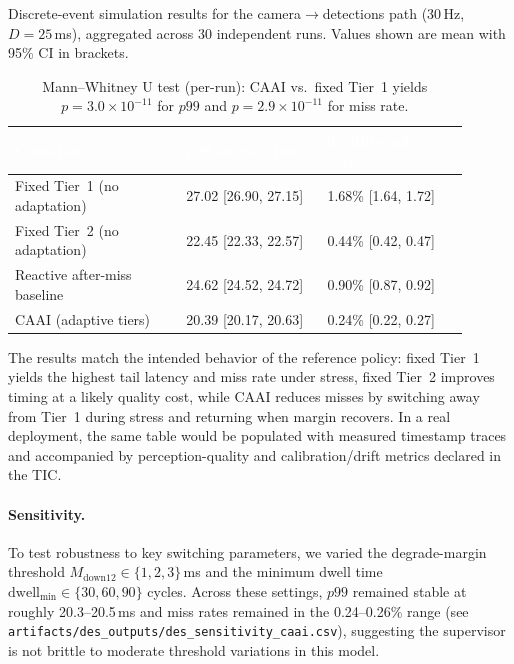 \documentclass[smallextended]{svjour3}
\begin{document}
\begin{table}[htbp]
  \centering
  \small
  \caption{Discrete-event simulation results for the camera\(\rightarrow\)detections path (30\,Hz, \(D=25\)\,ms), aggregated across 30 independent runs. Values shown are mean with 95\% CI in brackets.}
  \label{tab:sim_results}
  \renewcommand{\arraystretch}{1.15}
  \setlength{\tabcolsep}{2pt}
  \begin{tabular}{@{}L{0.34\linewidth}L{0.28\linewidth}L{0.28\linewidth}@{}}
    \toprule
    \textcolor{white}{\textbf{Condition}} &
    \textcolor{white}{\textbf{p99 latency (ms)}} &
    \textcolor{white}{\textbf{deadline miss rate}} \\
    \midrule
    Fixed Tier~1 (no adaptation) & 27.02 [26.90, 27.15] & 1.68\% [1.64, 1.72] \\
    Fixed Tier~2 (no adaptation) & 22.45 [22.33, 22.57] & 0.44\% [0.42, 0.47] \\
    Reactive after-miss baseline & 24.62 [24.52, 24.72] & 0.90\% [0.87, 0.92] \\
    CAAI (adaptive tiers)        & 20.39 [20.17, 20.63] & 0.24\% [0.22, 0.27] \\
    \bottomrule
  \end{tabular}
  \renewcommand{\arraystretch}{1}
  \caption*{\footnotesize Mann--Whitney U test (per-run): CAAI vs.\ fixed Tier~1 yields \(p=3.0\times10^{-11}\) for \(p99\) and \(p=2.9\times10^{-11}\) for miss rate.}
\end{table}

The results match the intended behavior of the reference policy: fixed Tier~1 yields
the highest tail latency and miss rate under stress, fixed Tier~2 improves timing at a
likely quality cost, while CAAI reduces misses by switching away from Tier~1 during
stress and returning when margin recovers. In a real deployment, the same table would be
populated with measured timestamp traces and accompanied by perception-quality and
calibration/drift metrics declared in the TIC.

\paragraph{Sensitivity.}
To test robustness to key switching parameters, we varied the degrade-margin threshold
\(M_{\mathrm{down12}}\in\{1,2,3\}\)\,ms and the minimum dwell time
\(\mathrm{dwell}_{\min}\in\{30,60,90\}\) cycles. Across these settings, \(p99\) remained
stable at roughly 20.3--20.5\,ms and miss rates remained in the 0.24--0.26\% range (see
\texttt{artifacts/des\_outputs/des\_sensitivity\_caai.csv}), suggesting the supervisor is
not brittle to moderate threshold variations in this model.
\end{document}
